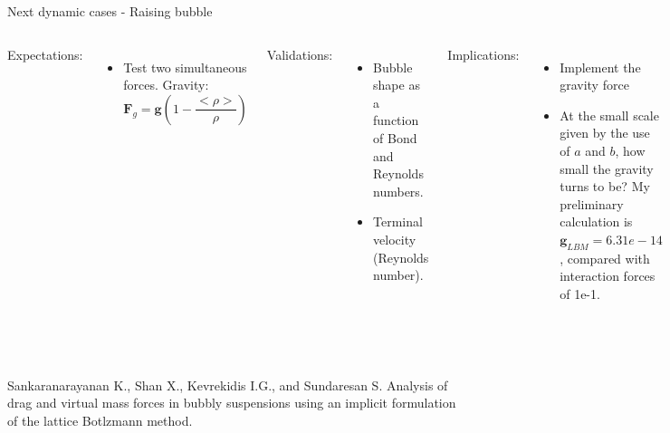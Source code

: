 \documentclass{beamer}
\begin{document}
	\begin{frame}{Next dynamic cases - Raising bubble}
				
		\begin{columns}
			
			Expectations:
			\begin{itemize}
				\item Test two simultaneous forces. Gravity:
				\begin{equation*}
					\mathbf{F}_g = \mathbf{g} (1- \frac{<\rho>}{\rho})
				\end{equation*}
			\end{itemize}
			
			Validations:
			\begin{itemize}
				\item Bubble shape as a function of Bond and Reynolds numbers.
				\item Terminal velocity (Reynolds number).
			\end{itemize}
			Implications:
			\begin{itemize}
				\item Implement the gravity force
				\item At the small scale given by the use of $a$ and $b$, how small the gravity turns to be? My preliminary calculation is $\mathbf{g}_{LBM} = 6.31 e-14$, compared with interaction forces of 1e-1.
			\end{itemize}
		\end{columns}
		~\\~\\
		{\tiny Sankaranarayanan K., Shan X., Kevrekidis I.G., and Sundaresan S. Analysis of drag and virtual mass forces in bubbly suspensions using an implicit formulation of the lattice Botlzmann method.}
	\end{frame}
	
\end{document}
